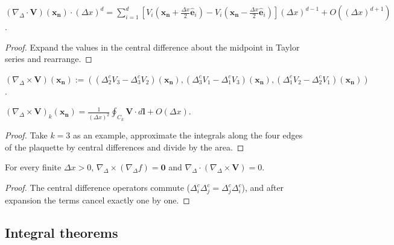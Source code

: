 \begin{proposition}\label{prop:discrete_divergence_flux}
$(\nabla_{\Delta}\cdot\mathbf{V})(\mathbf{x}_{\mathbf{n}})\cdot(\Delta x)^d=\sum_{i=1}^d[V_i(\mathbf{x}_{\mathbf{n}}+\tfrac{\Delta x}{2}\hat{\mathbf{e}}_i)-V_i(\mathbf{x}_{\mathbf{n}}-\tfrac{\Delta x}{2}\hat{\mathbf{e}}_i)](\Delta x)^{d-1}+O((\Delta x)^{d+1})$.
\end{proposition}

\begin{proof}
Expand the values in the central difference about the midpoint in Taylor series and rearrange.
\end{proof}

\begin{definition}\label{def:discrete_curl_strict}
$(\nabla_{\Delta}\times\mathbf{V})(\mathbf{x}_{\mathbf{n}}):=((\Delta_2^cV_3-\Delta_3^cV_2)(\mathbf{x}_{\mathbf{n}}),(\Delta_3^cV_1-\Delta_1^cV_3)(\mathbf{x}_{\mathbf{n}}),(\Delta_1^cV_2-\Delta_2^cV_1)(\mathbf{x}_{\mathbf{n}}))$.
\end{definition}

\begin{proposition}\label{prop:discrete_curl_circulation}
$(\nabla_{\Delta}\times\mathbf{V})_k(\mathbf{x}_{\mathbf{n}})=\frac{1}{(\Delta x)^2}\oint_{C_k}\mathbf{V}\cdot d\mathbf{l}+O(\Delta x)$.
\end{proposition}

\begin{proof}
Take $k=3$ as an example, approximate the integrals along the four edges of the plaquette by central differences and divide by the area.
\end{proof}

\begin{proposition}\label{prop:discrete_exact_identities}
For every finite $\Delta x>0$, $\nabla_{\Delta}\times(\nabla_{\Delta}f)=\mathbf{0}$ and $\nabla_{\Delta}\cdot(\nabla_{\Delta}\times\mathbf{V})=0$.
\end{proposition}

\begin{proof}
The central difference operators commute ($\Delta_i^c\Delta_j^c=\Delta_j^c\Delta_i^c$), and after expansion the terms cancel exactly one by one.
\end{proof}

\subsection{Integral theorems}

